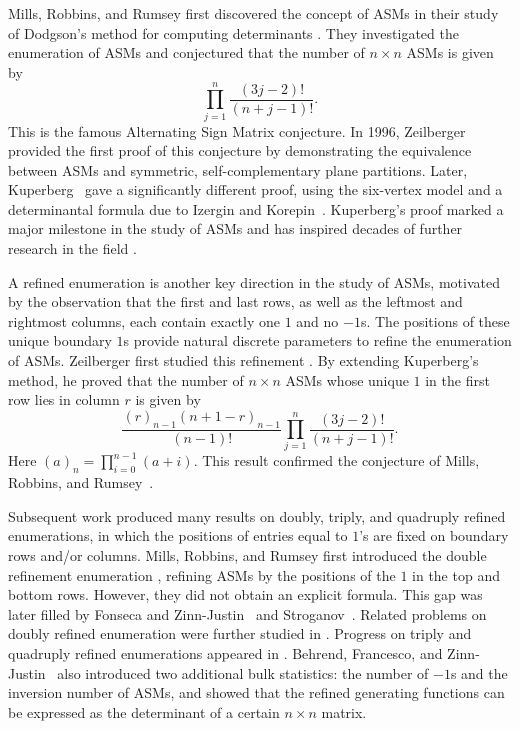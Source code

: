 \documentclass[12pt, a4paper]{amsart} %
\numberwithin{equation}{section}
\begin{document}
Mills, Robbins, and Rumsey first discovered the concept of ASMs in their study of Dodgson’s method for computing determinants \cite{MRR1, MRR2, RR}.
They investigated the enumeration of ASMs and conjectured that the number of $n\times n$ ASMs is given by
\begin{equation}\label{asm}
    \prod_{j=1}^{n}\frac{(3j-2)!}{(n+j-1)!}.
\end{equation}
This is the famous Alternating Sign Matrix conjecture. 
In 1996, Zeilberger~\cite{Ze96a} provided the first proof of this conjecture by demonstrating the equivalence between ASMs and symmetric, self-complementary plane partitions. 
Later, Kuperberg~\cite{Ku96} gave a significantly different proof, using 
the six-vertex model and a determinantal formula due to Izergin and Korepin~\cite{Iz87, KBI93}.
Kuperberg's proof marked a major milestone in the study of ASMs and has inspired decades of further research in the field \cite{
Fi07, FK20a, FK20b, FK22, KBI93}.

A refined enumeration is another key direction in the study of ASMs, motivated by the observation that the first and last rows, as well as the leftmost and rightmost columns,
each contain exactly one $1$ and no $-1$s.
The positions of these unique boundary $1$s provide natural discrete parameters to refine the enumeration of ASMs.
Zeilberger first studied this refinement \cite{Ze96b}. By extending Kuperberg’s method, he proved that the number of $ n\times n$ ASMs whose unique $1$ in the first row lies in column $r$ is given by 
$$
     \frac{(r)_{n-1}(n+1-r)_{n-1}}{(n-1)!}\prod_{j=1}^{n}\frac{(3j-2)!}{(n+j-1)!}.
$$
Here $(a)_{n}=\prod_{i=0}^{n-1}(a+i)$. 
This result confirmed the conjecture of Mills, Robbins, and Rumsey~\cite{MRR1, MRR2}.

Subsequent work produced many results on doubly, triply, and quadruply refined enumerations, in which the positions of entries equal to $1$'s are fixed on boundary rows and/or columns.
Mills, Robbins, and Rumsey first introduced the double refinement enumeration \cite{MRR3}, refining ASMs by the positions of the $1$ in the top and bottom rows.
However, they did not obtain an explicit formula.
This gap was later filled by Fonseca and Zinn-Justin~\cite{FZ08} and Stroganov~\cite{St06}.
Related problems on doubly refined enumeration were further studied in \cite{FR09, Fi11, KR10, BEZ13}.
Progress on triply and quadruply refined enumerations appeared in \cite{AR13, Beh13, BEZ12}.
Behrend, Francesco, and Zinn-Justin~\cite{BEZ13}
also introduced two additional bulk statistics: the number of $-1$s and the inversion number of ASMs, and showed that the refined generating functions can be expressed as the determinant of a certain $n\times n$ matrix. 
 
\end{document}
